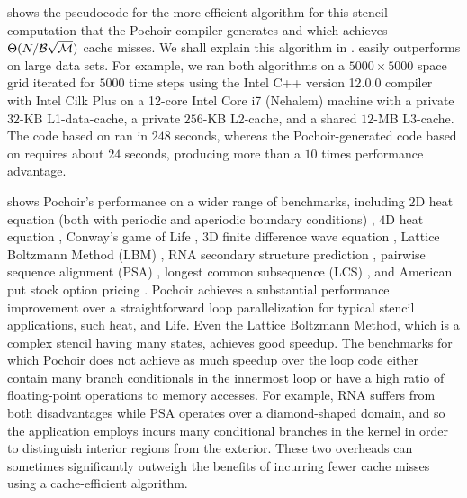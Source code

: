  shows the pseudocode for the more efficient
algorithm for this stencil computation that the Pochoir compiler
generates and which achieves $\Theta(N/\cal B\sqrt{\cal M})$ cache
misses.  We shall explain this algorithm in .  
easily outperforms  on large data sets.  For example, we
ran both algorithms on a $5000 \times 5000$ space grid iterated for
$5000$ time steps using the Intel C++ version 12.0.0 compiler with
Intel Cilk Plus \cite{IntelCilkPlus10} on a 12-core Intel Core i7
(Nehalem) machine with a private $32$-KB L1-data-cache, a private
$256$-KB L2-cache, and a shared $12$-MB L3-cache.  The code based on
 ran in $248$ seconds, whereas the Pochoir-generated code
based on  requires about $24$ seconds, producing more than
a $10$ times performance advantage.

 shows Pochoir's performance on a wider range of
benchmarks, including
 $2$D heat equation (both with periodic and aperiodic boundary conditions) \cite{Epperson07},
 $4$D heat equation \cite{Epperson07},
 Conway's game of Life \cite{Gardner70},
 $3$D finite difference wave equation \cite{Micikevicius09}, 
 Lattice Boltzmann Method (LBM) \cite{MeiShYu00},
 RNA secondary structure prediction \cite{ChowdhuryLeRa10,Akutsu00},
 pairwise sequence alignment (PSA) \cite{Gotoh82},
 longest common subsequence (LCS) \cite{CormenLeRi+09}, and
 American put stock option pricing \cite{John06}.
Pochoir achieves a substantial performance improvement over a
straightforward loop parallelization for typical stencil applications,
such heat, and Life.  Even the Lattice Boltzmann Method, which is a
complex stencil having many states, achieves good speedup.  The
benchmarks for which Pochoir does not achieve as much speedup over the
loop code either contain many branch conditionals in the innermost
loop or have a high ratio of floating-point operations to memory
accesses.  For example, RNA suffers from both disadvantages while PSA
operates over a diamond-shaped domain, and so the application employs
incurs many conditional branches in the kernel in order to distinguish
interior regions from the exterior.  These two overheads can sometimes
significantly outweigh the benefits of incurring fewer cache misses
using a cache-efficient algorithm.

